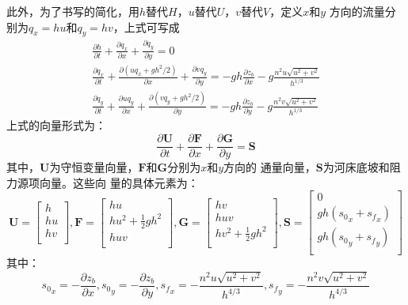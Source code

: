 此外，为了书写的简化，用$h$替代$H$，$u$替代$U$，$v$替代$V$，定义$x$和$y$
方向的流量分别为$q_{x}=hu$和$q_{y}=hv$，上式可写成
\begin{equation}
  \begin{gathered}
    \frac{\partial h}{\partial t} +
    \frac{\partial q_{x}}{\partial x} +
    \frac{\partial q_{y}}{\partial y}
    =
    0
    \\
    \frac{\partial q_{x}}{\partial t} +
    \frac{\partial (uq_{x}+gh^{2}/2)}{\partial x} +
    \frac{\partial vq_{y}}{\partial y}
    =
    -gh\frac{\partial z_{b}}{\partial x}
    -g\frac{n^{2}u\sqrt{u^{2}+v^{2}}}{h^{1/3}}
    \\
    \frac{\partial q_{y}}{\partial t} +
    \frac{\partial uq_{y}}{\partial x} +
    \frac{\partial (vq_{y}+gh^{2}/2)}{\partial y}
    =
    -gh\frac{\partial z_{b}}{\partial y}
    -g\frac{n^{2}v\sqrt{u^{2}+v^{2}}}{h^{1/3}}
  \end{gathered}
\end{equation}
上式的向量形式为：
\begin{equation}
  \frac{\partial \mathbf{U}}{\partial t} +
  \frac{\partial \mathbf{F}}{\partial x} +
  \frac{\partial \mathbf{G}}{\partial y}
  =
  \mathbf{S}
\end{equation}
其中，$\mathbf{U}$为守恒变量向量，$\mathbf{F}$和$\mathbf{G}$分别为$x$和$y$方向的
通量向量，$\mathbf{S}$为河床底坡和阻力源项向量。这些向
量的具体元素为：
\begin{equation}
  \mathbf{U} =
  \begin{bmatrix}
    h \\
    hu \\
    hv \\
  \end{bmatrix}
  ,
  \mathbf{F} =
  \begin{bmatrix}
    hu \\
    hu^{2} + \frac{1}{2}gh^{2} \\
    huv \\
  \end{bmatrix}
  ,
  \mathbf{G} =
  \begin{bmatrix}
    hv \\
    huv \\
    hv^{2} + \frac{1}{2}gh^{2} \\
  \end{bmatrix}
  ,
  \mathbf{S} =
  \begin{bmatrix}
    0 \\
    gh({s_{0}}_{x} + {s_{f}}_{x})\\
    gh({s_{0}}_{y} + {s_{f}}_{y})\\
  \end{bmatrix}
\end{equation}
其中：
\begin{equation}
  {s_{0}}_{x} = - \frac{\partial z_{b}}{\partial x}, 
  {s_{0}}_{y} = - \frac{\partial z_{b}}{\partial y}, 
  {s_{f}}_{x} = - \frac{n^{2}u\sqrt{u^2+v^2}}{h^{4/3}}, 
  {s_{f}}_{y} = - \frac{n^{2}v\sqrt{u^2+v^2}}{h^{4/3}} 
\end{equation}


